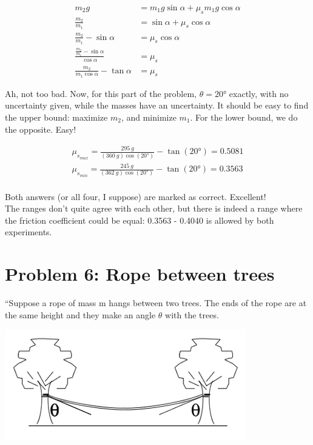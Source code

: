 \documentclass[8.01x]{subfiles}
\begin{document}
\begin{align}
m_2 g &= m_1 g \sin \alpha + \mu_s m_1 g \cos \alpha\\
\frac{m_2}{m_1} &= \sin \alpha + \mu_s \cos \alpha\\
\frac{m_2}{m_1} - \sin \alpha &= \mu_s \cos \alpha\\
\frac{\frac{m_2}{m_1} - \sin \alpha}{\cos \alpha} &= \mu_s\\
\frac{m_2}{m_1 \cos \alpha} - \tan \alpha &= \mu_s
\end{align}

Ah, not too bad. Now, for this part of the problem, $\theta = \ang{20}$ exactly, with no uncertainty given, while the masses have an uncertainty. It should be easy to find the upper bound: maximize $m_2$, and minimize $m_1$. For the lower bound, we do the opposite. Easy!

\begin{align}
\mu_{s_{max}} = \frac{\SI{295}{g}}{(\SI{360}{g}) \cos(\ang{20})} - \tan(\ang{20}) = 0.5081\\
\mu_{s_{min}} = \frac{\SI{245}{g}}{(\SI{362}{g}) \cos(\ang{20})} - \tan(\ang{20}) = 0.3563\\
\end{align}

Both answers (or all four, I suppose) are marked as correct. Excellent!\\
The ranges don't quite agree with each other, but there is indeed a range where the friction coefficient could be equal: 0.3563 - 0.4040 is allowed by both experiments.

\section{Problem 6: Rope between trees}

``Suppose a rope of mass m hangs between two trees. The ends of the rope are at the same height and they make an angle $\theta$ with the trees.

\begin{center}
\includegraphics[scale=0.5]{Graphics/h3p6}
\end{center}
\end{document}
